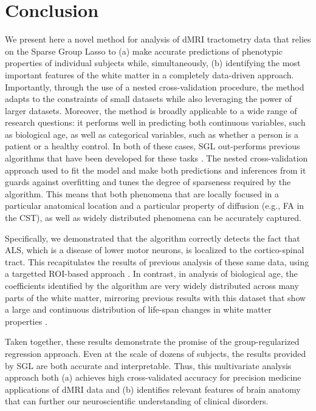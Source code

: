 \section*{Conclusion}

We present here a novel method for analysis of dMRI tractometry data that relies
on the Sparse Group Lasso \cite{simon2013sparse} to (a) make accurate
predictions of phenotypic properties of individual subjects while,
simultaneously, (b) identifying the most important features of the white matter
in a completely data-driven approach. Importantly, through the use of a nested
cross-validation procedure, the method adapts to the constraints of small
datasets while also leveraging the power of larger datasets. Moreover, the
method is broadly applicable to a wide range of research questions: it performs
well in predicting both continuous variables, such as biological age, as well as
categorical variables, such as whether a person is a patient or a healthy control.
In both of these cases, SGL out-performs previous algorithms that have been
developed for these tasks \cite{sarica2017corticospinal, Richard2018-ux}. The
nested cross-validation approach used to fit the model and make both predictions
and inferences from it guards against overfitting and tunes the degree of
sparseness required by the algorithm. This means that both phenomena that are
locally focused in a particular anatomical location and a particular property of
diffusion (e.g., FA in the CST), as well as widely distributed phenomena can be
accurately captured.

Specifically, we demonstrated that the algorithm correctly detects the fact that
ALS, which is a disease of lower motor neurons, is localized to the
cortico-spinal tract. This recapitulates the results of previous analysis of
these same data, using a targetted ROI-based approach
\cite{sarica2017corticospinal}. In contrast, in analysis of biological age, the
coefficients identified by the algorithm are very widely distributed across many
parts of the white matter, mirroring previous results with this dataset that
show a large and continuous distribution of life-span changes in white matter
properties \cite{yeatman2014lifespan}.

Taken together, these results demonstrate the promise of the group-regularized
regression approach. Even at the scale of dozens of subjects, the results
provided by SGL are both accurate and interpretable. Thus, this multivariate
analysis approach both (a) achieves high cross-validated accuracy for precision
medicine applications of dMRI data and (b) identifies relevant features of brain
anatomy that can further our neuroscientific understanding of clinical
disorders.

